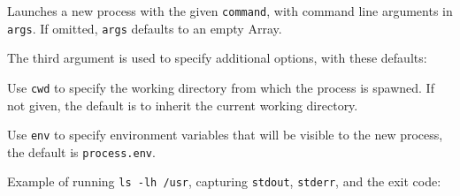Launches a new process with the given \texttt{command}, with command
line arguments in \texttt{args}. If omitted, \texttt{args} defaults to
an empty Array.

The third argument is used to specify additional options, with these
defaults:

\begin{Shaded}
\begin{Highlighting}[]
\NormalTok{\{ }\NormalTok{: }\NormalTok{,}
  \NormalTok{: }
\NormalTok{\}}
\end{Highlighting}
\end{Shaded}

Use \texttt{cwd} to specify the working directory from which the process
is spawned. If not given, the default is to inherit the current working
directory.

Use \texttt{env} to specify environment variables that will be visible
to the new process, the default is \texttt{process.env}.

Example of running \texttt{ls\ -lh\ /usr}, capturing \texttt{stdout},
\texttt{stderr}, and the exit code:

\begin{Shaded}
\begin{Highlighting}[]
 \NormalTok{(}\NormalTok{,}
    \NormalTok{(}\NormalTok{, [}\NormalTok{, }\NormalTok{]);}

\NormalTok{(}\NormalTok{, } 
  \NormalTok{(} 
\NormalTok{\});}

\NormalTok{(}\NormalTok{, } 
  \NormalTok{(} 
\NormalTok{\});}

\NormalTok{(}\NormalTok{, } 
  \NormalTok{(} 
\NormalTok{\});}
\end{Highlighting}
\end{Shaded}


